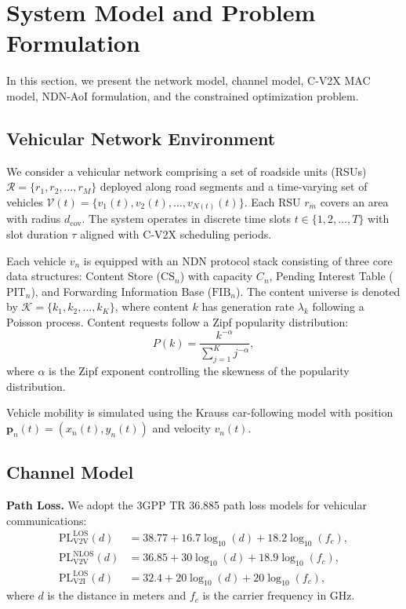 \documentclass[journal]{IEEEtran}
\begin{document}
\section{System Model and Problem Formulation} \label{sec.net}

In this section, we present the network model, channel model, C-V2X MAC model, NDN-AoI formulation, and the constrained optimization problem.

\subsection{Vehicular Network Environment} \label{subsec:net_env}

We consider a vehicular network comprising a set of roadside units (RSUs) $\mathcal{R} = \{r_1, r_2, \ldots, r_M\}$ deployed along road segments and a time-varying set of vehicles $\mathcal{V}(t) = \{v_1(t), v_2(t), \ldots, v_{N(t)}(t)\}$. Each RSU $r_m$ covers an area with radius $d_{\text{cov}}$. The system operates in discrete time slots $t \in \{1, 2, \ldots, T\}$ with slot duration $\tau$ aligned with C-V2X scheduling periods.

Each vehicle $v_n$ is equipped with an NDN protocol stack consisting of three core data structures: Content Store ($\text{CS}_n$) with capacity $C_n$, Pending Interest Table ($\text{PIT}_n$), and Forwarding Information Base ($\text{FIB}_n$). The content universe is denoted by $\mathcal{K} = \{k_1, k_2, \ldots, k_K\}$, where content $k$ has generation rate $\lambda_k$ following a Poisson process. Content requests follow a Zipf popularity distribution:
\begin{equation} \label{eq:zipf}
P(k) = \frac{k^{-\alpha}}{\sum_{j=1}^{K} j^{-\alpha}},
\end{equation}
where $\alpha$ is the Zipf exponent controlling the skewness of the popularity distribution.

Vehicle mobility is simulated using the Krauss car-following model with position $\mathbf{p}_n(t) = (x_n(t), y_n(t))$ and velocity $v_n(t)$.

\subsection{Channel Model} \label{subsec:channel}

\textbf{Path Loss.} We adopt the 3GPP TR 36.885 path loss models for vehicular communications:
\begin{align}
\text{PL}_{\text{V2V}}^{\text{LOS}}(d) &= 38.77 + 16.7 \log_{10}(d) + 18.2 \log_{10}(f_c), \label{eq:pl_v2v_los} \\
\text{PL}_{\text{V2V}}^{\text{NLOS}}(d) &= 36.85 + 30 \log_{10}(d) + 18.9 \log_{10}(f_c), \label{eq:pl_v2v_nlos} \\
\text{PL}_{\text{V2I}}^{\text{LOS}}(d) &= 32.4 + 20 \log_{10}(d) + 20 \log_{10}(f_c), \label{eq:pl_v2i}
\end{align}
where $d$ is the distance in meters and $f_c$ is the carrier frequency in GHz.
\end{document}
